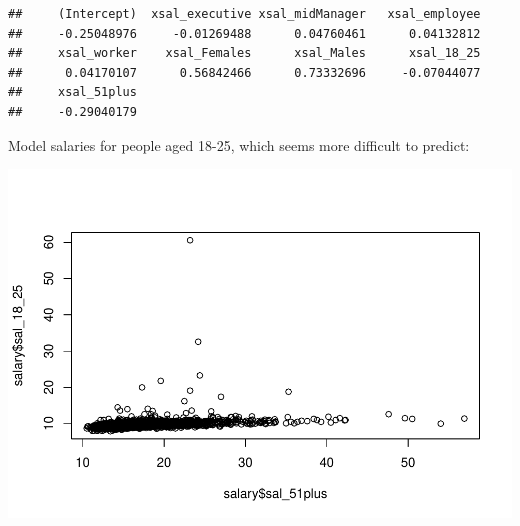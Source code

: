 \documentclass[]{article}
\newenvironment{Shaded}{\begin{snugshade}}{\end{snugshade}}
\newcommand{\KeywordTok}[1]{\textcolor[rgb]{0.13,0.29,0.53}{\textbf{#1}}}
\newcommand{\DataTypeTok}[1]{\textcolor[rgb]{0.13,0.29,0.53}{#1}}
\newcommand{\DecValTok}[1]{\textcolor[rgb]{0.00,0.00,0.81}{#1}}
\newcommand{\CommentTok}[1]{\textcolor[rgb]{0.56,0.35,0.01}{\textit{#1}}}
\newcommand{\OperatorTok}[1]{\textcolor[rgb]{0.81,0.36,0.00}{\textbf{#1}}}
\newcommand{\NormalTok}[1]{#1}
\begin{document}
\begin{Shaded}
\end{Shaded}

\begin{verbatim}
##     (Intercept)  xsal_executive xsal_midManager   xsal_employee 
##     -0.25048976     -0.01269488      0.04760461      0.04132812 
##     xsal_worker    xsal_Females      xsal_Males      xsal_18_25 
##      0.04170107      0.56842466      0.73332696     -0.07044077 
##     xsal_51plus 
##     -0.29040179
\end{verbatim}

Model salaries for people aged 18-25, which seems more difficult to
predict:

\begin{Shaded}
\end{Shaded}

\includegraphics{TSLproject_files/figure-latex/unnamed-chunk-18-1.pdf}
\end{document}
